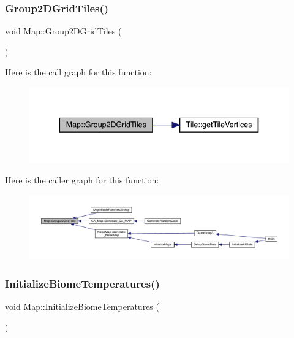 \subsubsection{\texorpdfstring{Group2\+D\+Grid\+Tiles()}{Group2DGridTiles()}}
{\footnotesize\ttfamily void Map\+::\+Group2\+D\+Grid\+Tiles (\begin{DoxyParamCaption}{ }\end{DoxyParamCaption})}

Here is the call graph for this function\+:
\nopagebreak
\begin{figure}[H]
\begin{center}
\leavevmode
\includegraphics[width=340pt]{dd/d11/class_map_af2b4481fa4588c8aa5ab6e8c45c5f7cf_cgraph}
\end{center}
\end{figure}
Here is the caller graph for this function\+:
\nopagebreak
\begin{figure}[H]
\begin{center}
\leavevmode
\includegraphics[width=350pt]{dd/d11/class_map_af2b4481fa4588c8aa5ab6e8c45c5f7cf_icgraph}
\end{center}
\end{figure}
\mbox{\label{class_map_ae5a05885aef979310e900b8343679abd}} 
\subsubsection{\texorpdfstring{Initialize\+Biome\+Temperatures()}{InitializeBiomeTemperatures()}}
{\footnotesize\ttfamily void Map\+::\+Initialize\+Biome\+Temperatures (\begin{DoxyParamCaption}{ }\end{DoxyParamCaption})}

